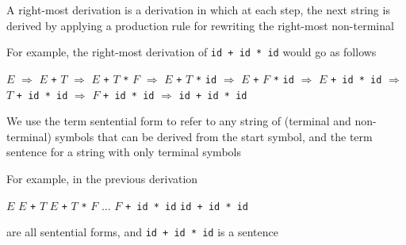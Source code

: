 \documentclass[8pt,a4paper,compress,handout]{beamer}
\newcommand{\mm}[1]{$#1$}
\newenvironment{spaced}
{
\smallskip
\hspace{.5cm}
\begin{minipage}[c]{\textwidth}
}
{
\end{minipage}
\smallskip
}
\begin{document}
\begin{frame}[fragile]
\pause

A right-most derivation is a derivation in which at each step, the next string is derived by applying a production rule for rewriting the right-most non-terminal

\pause
\bigskip

For example, the right-most derivation of \lstinline{id + id * id} would go as follows

\text{ }
\begin{spaced}
\begin{production}
\underline{\mm{E}} \mm{\Rightarrow} \mm{E} \lstinline{+} \underline{\mm{T}}
   \mm{\Rightarrow} \mm{E} \lstinline{+} \mm{T} \lstinline{*} \underline{\mm{F}}
   \mm{\Rightarrow} \mm{E} \lstinline{+} \underline{\mm{T}} \lstinline{*} \lstinline{id}
   \mm{\Rightarrow} \mm{E} \lstinline{+} \underline{\mm{F}} \lstinline{*} \lstinline{id}
   \mm{\Rightarrow} \underline{\mm{E}} \lstinline{+ id * id}
   \mm{\Rightarrow} \underline{\mm{T}} \lstinline{+ id * id}
   \mm{\Rightarrow} \underline{\mm{F}} \lstinline{+ id * id}
   \mm{\Rightarrow} \lstinline{id + id * id}
\end{production}
\end{spaced}

\pause

We use the term sentential form to refer to any string of (terminal and non-terminal) symbols that can be derived from the start symbol, and the term sentence for a string with only terminal symbols

\pause
\bigskip

For example, in the previous derivation

\text{ }
\begin{spaced}
\begin{production}
\mm{E}
\mm{E} \lstinline{+} \mm{T}
\mm{E} \lstinline{+} \mm{T} \lstinline{*} \mm{F}
...
\mm{F} \lstinline{+ id * id}
\lstinline{id + id * id}
\end{production}
\end{spaced}

are all sentential forms, and \lstinline{id + id * id} is a sentence
\end{frame}
\end{document}
